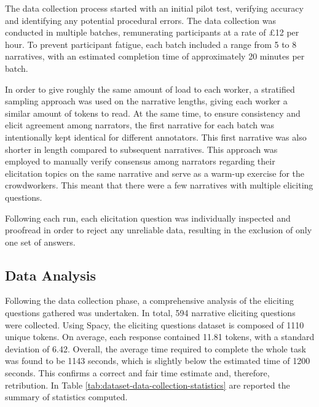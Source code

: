 The data collection process started with an initial pilot test, verifying accuracy and identifying any potential procedural errors. The data collection was conducted in multiple batches, remunerating participants at a rate of £12 per hour. To prevent participant fatigue, each batch included a range from 5 to 8 narratives, with an estimated completion time of approximately 20 minutes per batch.

In order to give roughly the same amount of load to each worker, a stratified sampling approach was used on the narrative lengths, giving each worker a similar amount of tokens to read. At the same time, to ensure consistency and elicit agreement among narrators, the first narrative for each batch was intentionally kept identical for different annotators. This first narrative was also shorter in length compared to subsequent narratives. This approach was employed to manually verify consensus among narrators regarding their elicitation topics on the same narrative and serve as a warm-up exercise for the crowdworkers. This meant that there were a few narratives with multiple eliciting questions.

Following each run, each elicitation question was individually inspected and proofread in order to reject any unreliable data, resulting in the exclusion of only one set of answers.


\subsection{Data Analysis}
\label{cha:methodology-crowdsourcing-data-analysis}


Following the data collection phase, a comprehensive analysis of the eliciting questions gathered was undertaken. In total, 594 narrative eliciting questions were collected. Using Spacy, the eliciting questions dataset is composed of 1110 unique tokens. On average, each response contained 11.81 tokens, with a standard deviation of 6.42. Overall, the average time required to complete the whole task was found to be 1143 seconds, which is slightly below the estimated time of 1200 seconds. This confirms a correct and fair time estimate and, therefore, retribution. In Table \ref{tab:dataset-data-collection-statistics} are reported the summary of statistics computed. 

